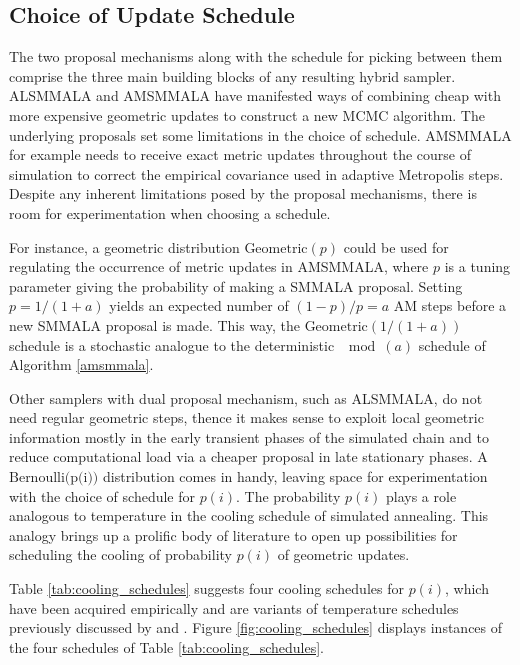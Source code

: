 \documentclass[twoside,11pt]{article}
\begin{document}
\subsection{Choice of Update Schedule}

The two proposal mechanisms along with the schedule for picking between them comprise the three main building blocks of any
resulting hybrid sampler. ALSMMALA and AMSMMALA have manifested ways of combining cheap with more expensive geometric updates
to construct a new MCMC algorithm. The underlying proposals set some limitations in the choice of schedule. AMSMMALA for
example needs to receive exact metric updates throughout the course of simulation to correct the empirical covariance used in
adaptive Metropolis steps. Despite any inherent limitations posed by the proposal mechanisms, there is room for 
experimentation when choosing a schedule.

For instance, a geometric distribution $\mbox{Geometric}(p)$ could be used for regulating the occurrence of metric updates 
in AMSMMALA, where $p$ is a tuning parameter giving the probability of making a SMMALA proposal. Setting $p=1/(1+a)$ yields 
an expected number of $(1-p)/p=a$ AM steps before a new SMMALA proposal is made. This way, the $\mbox{Geometric}(1/(1+a))$ 
schedule is a stochastic analogue to the deterministic $\mod{(a)}$ schedule of Algorithm \ref{amsmmala}.

Other samplers with dual proposal mechanism, such as ALSMMALA, do not need regular geometric steps, thence it makes sense to 
exploit local geometric information mostly in the early transient phases of the simulated chain and to reduce computational 
load via a cheaper proposal in late stationary phases. A $\mbox{Bernoulli(p(i))}$ distribution comes in handy, leaving space 
for experimentation with the choice of schedule for $p(i)$. The probability $p(i)$ plays a role analogous to temperature in 
the cooling schedule of simulated annealing. This analogy brings up a prolific body of literature to open up possibilities 
for scheduling the cooling of probability $p(i)$ of geometric updates.

Table \ref{tab:cooling_schedules} suggests four cooling schedules for $p(i)$, which have been acquired empirically and are 
variants of temperature schedules previously discussed by \cite{haj__coo} and \cite{nou_and__aco}.
Figure \ref{fig:cooling_schedules} displays instances of the four schedules of Table \ref{tab:cooling_schedules}.
\end{document}
